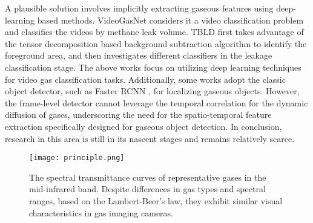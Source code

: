 A plausible solution involves implicitly extracting gaseous features using deep-learning based methods. VideoGasNet \cite{wang2022videogasnet} considers it a video classification problem and classifies the videos by methane leak volume. TBLD \cite{bin2021tensor} first takes advantage of the tensor decomposition based background subtraction algorithm to identify the foreground area, and then investigates different classifiers in the leakage classification stage. The above works focus on utilizing deep learning techniques for video gas classification tasks.  Additionally, some works \cite{bin2022multimodal,bin2022foreground,shi2020real} adopt the classic object detector, such as Faster RCNN \cite{ren2015faster}, for localizing gaseous objects. However, the frame-level detector cannot leverage the temporal correlation for the dynamic diffusion of gases, underscoring the need for the spatio-temporal feature extraction specifically designed for gaseous object detection. In conclusion,  research in this area is still in its nascent stages and remains relatively scarce.


\begin{figure}[t]
	\begin{center}
		\texttt{[image: principle.png]}
	\end{center}
	\vspace{-1.0em}
	\caption{The spectral transmittance curves of representative gases in the mid-infrared band. Despite differences in gas types and spectral ranges, based on the Lambert-Beer's law, they exhibit similar visual characteristics in gas imaging cameras.  }
	\label{fig:principle}
		\vspace{-0.0em}
\end{figure}